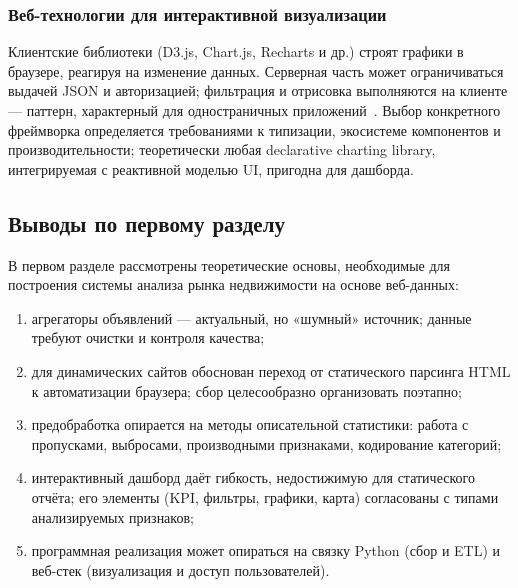 \subsubsection{Веб-технологии для интерактивной визуализации}

Клиентские библиотеки (D3.js, Chart.js, Recharts и др.) строят графики в браузере, реагируя на изменение данных. Серверная часть может ограничиваться выдачей JSON и авторизацией; фильтрация и отрисовка выполняются на клиенте --- паттерн, характерный для одностраничных приложений~\cite{sultanov2022,nesterov2024}. Выбор конкретного фреймворка определяется требованиями к типизации, экосистеме компонентов и производительности; теоретически любая declarative charting library, интегрируемая с реактивной моделью UI, пригодна для дашборда.

\subsection{Выводы по первому разделу}

В первом разделе рассмотрены теоретические основы, необходимые для построения системы анализа рынка недвижимости на основе веб-данных:
\begin{enumerate}
    \item агрегаторы объявлений --- актуальный, но «шумный» источник; данные требуют очистки и контроля качества;
    \item для динамических сайтов обоснован переход от статического парсинга HTML к автоматизации браузера; сбор целесообразно организовать поэтапно;
    \item предобработка опирается на методы описательной статистики: работа с пропусками, выбросами, производными признаками, кодирование категорий;
    \item интерактивный дашборд даёт гибкость, недостижимую для статического отчёта; его элементы (KPI, фильтры, графики, карта) согласованы с типами анализируемых признаков;
    \item программная реализация может опираться на связку Python (сбор и ETL) и веб-стек (визуализация и доступ пользователей).
\end{enumerate}
